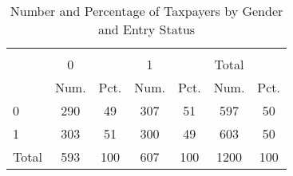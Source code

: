 \begin{table}[htbp]\centering
\def\sym#1{\ifmmode^{#1}\else\(^{#1}\)\fi}
\caption{Number and Percentage of Taxpayers by Gender and Entry Status}
\begin{tabular}{l*{3}{cc}}
\hline\hline
            &\multicolumn{6}{c}{}                                                         \\
            &           0&            &           1&            &       Total&            \\
            &        Num.&        Pct.&        Num.&        Pct.&        Num.&        Pct.\\
\hline
0           &         290&          49&         307&          51&         597&          50\\
1           &         303&          51&         300&          49&         603&          50\\
Total       &         593&         100&         607&         100&        1200&         100\\
\hline\hline
\end{tabular}
\end{table}

